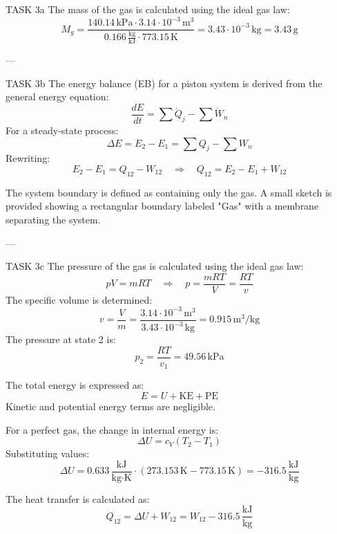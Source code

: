 TASK 3a  
The mass of the gas is calculated using the ideal gas law:  
\[
M_g = \frac{140.14 \, \text{kPa} \cdot 3.14 \cdot 10^{-3} \, \text{m}^3}{0.166 \, \frac{\text{kg}}{\text{kJ}} \cdot 773.15 \, \text{K}} = 3.43 \cdot 10^{-3} \, \text{kg} = 3.43 \, \text{g}
\]

---

TASK 3b  
The energy balance (EB) for a piston system is derived from the general energy equation:  
\[
\frac{dE}{dt} = \sum \dot{Q}_j - \sum \dot{W}_n
\]  
For a steady-state process:  
\[
\Delta E = E_2 - E_1 = \sum Q_j - \sum W_n
\]  
Rewriting:  
\[
E_2 - E_1 = Q_{12} - W_{12} \quad \Rightarrow \quad Q_{12} = E_2 - E_1 + W_{12}
\]  

The system boundary is defined as containing only the gas. A small sketch is provided showing a rectangular boundary labeled "Gas" with a membrane separating the system.

---

TASK 3c  
The pressure of the gas is calculated using the ideal gas law:  
\[
pV = mRT \quad \Rightarrow \quad p = \frac{mRT}{V} = \frac{RT}{v}
\]  
The specific volume is determined:  
\[
v = \frac{V}{m} = \frac{3.14 \cdot 10^{-3} \, \text{m}^3}{3.43 \cdot 10^{-3} \, \text{kg}} = 0.915 \, \text{m}^3/\text{kg}
\]  
The pressure at state 2 is:  
\[
p_2 = \frac{RT}{v_1} = 49.56 \, \text{kPa}
\]

The total energy is expressed as:  
\[
E = U + \text{KE} + \text{PE}
\]  
Kinetic and potential energy terms are negligible.  

For a perfect gas, the change in internal energy is:  
\[
\Delta U = c_V (T_2 - T_1)
\]  
Substituting values:  
\[
\Delta U = 0.633 \, \frac{\text{kJ}}{\text{kg·K}} \cdot (273.153 \, \text{K} - 773.15 \, \text{K}) = -316.5 \, \frac{\text{kJ}}{\text{kg}}
\]

The heat transfer is calculated as:  
\[
Q_{12} = \Delta U + W_{12} = W_{12} - 316.5 \, \frac{\text{kJ}}{\text{kg}}
\]
